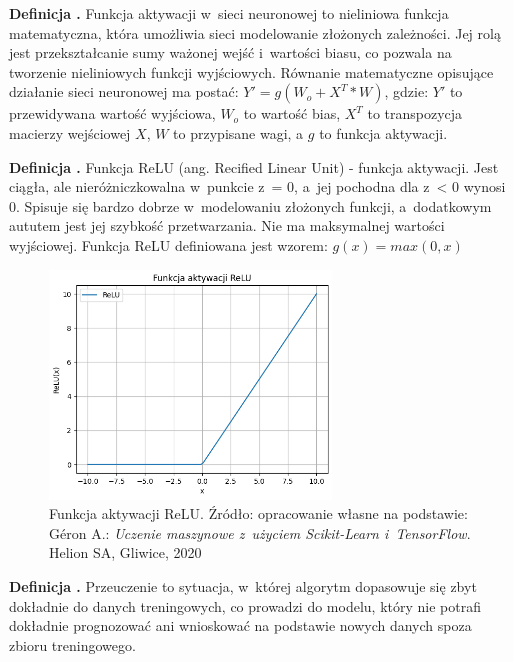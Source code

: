 \noindent
\textbf{Definicja .}
\incrementdefinitionIndex
Funkcja aktywacji w~sieci neuronowej to nieliniowa funkcja matematyczna,
która umożliwia sieci modelowanie złożonych zależności.
Jej rolą jest przekształcanie sumy ważonej wejść i~wartości biasu,
co pozwala na tworzenie nieliniowych funkcji wyjściowych.
Równanie matematyczne opisujące działanie sieci neuronowej ma postać: $Y' = g(W_o + X^T * W)$, gdzie:
$Y'$ to przewidywana wartość wyjściowa,
$W_o$ to wartość bias,
$X^T$ to transpozycja macierzy wejściowej $X$,
$W$ to przypisane wagi,
a $g$ to funkcja aktywacji.

\noindent
\textbf{Definicja .}
\incrementdefinitionIndex
Funkcja ReLU (ang. Recified Linear Unit) - funkcja aktywacji.
Jest ciągła, ale nieróżniczkowalna w~punkcie z~= 0, a~jej pochodna dla z~< 0 wynosi 0.
Spisuje się bardzo dobrze w~modelowaniu złożonych funkcji, a~dodatkowym aututem jest jej szybkość przetwarzania.
Nie ma maksymalnej wartości wyjściowej.
Funkcja ReLU definiowana jest wzorem:
$g(x) = max(0, x)$

\begin{figure}[ht]
	\centering
	\includegraphics[width=7.5cm]{resources/machine-learning/images/def_relu.png}
	\caption{Funkcja aktywacji ReLU.
		Źródło: opracowanie własne na podstawie:
        Géron A.: \textit{Uczenie maszynowe z~użyciem Scikit-Learn i~TensorFlow}. Helion SA, Gliwice, 2020}
    \label{Fig:def-1}
\end{figure}
\FloatBarrier

\noindent
\textbf{Definicja .}
\incrementdefinitionIndex
Przeuczenie to sytuacja, w~której algorytm dopasowuje się zbyt dokładnie do danych treningowych,
co prowadzi do modelu, który nie potrafi dokładnie prognozować ani wnioskować na podstawie nowych danych spoza zbioru treningowego.

